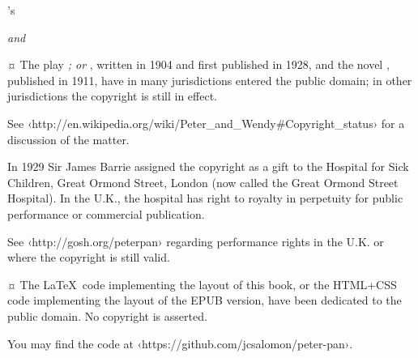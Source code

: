 
\pagestyle{empty}


\vspace*{\fill}
\begin{center}
\HUGE \thetitle
\end{center}
\vspace*{\fill}
\cleardoublepage


\vspace*{\fill}
\begin{center}
\Large\theauthor’s\par
\HUGE\thetitle
\end{center}
\begin{center}\huge\thebooktitle\end{center}
\begin{center}\huge\emph{\Large and}\end{center}
\begin{center}\huge\theplaytitle\end{center}
\vspace*{\fill}
\clearpage


\begingroup
\footnotesize
\setlength{\parindent}{0pt}
\setlength{\parskip}{\baselineskip}

\ccPublicDomain¤
The play \emph{\thetitle; or \theplaytitle}, written in 1904 and first published in 1928,
and the novel \emph{\thebooktitle}, published in 1911,
have in many jurisdictions entered the public domain;
in other jurisdictions the copyright is still in effect.

See ‹http://en.wikipedia.org/wiki/Peter\_and\_Wendy\#Copyright\_status›
for a discussion of the matter.

In 1929 Sir James Barrie assigned the copyright as a gift
to the Hospital for Sick Children, Great Ormond Street, London
(now called the Great Ormond Street Hospital).
In the U.K., the hospital has right to royalty in perpetuity
for public performance or commercial publication.

See ‹http://gosh.org/peterpan› regarding performance rights
in the U.K. or where the copyright is still valid.

\ccZero¤
The \LaTeX\ code implementing the layout of this book,
or the HTML+CSS code implementing the layout of the EPUB version,
have been dedicated to the public domain.
No copyright is asserted.

You may find the code at ‹https://github.com/jcsalomon/peter-pan›.

\endgroup
\cleardoublepage

\tableofcontents*

\endinput
